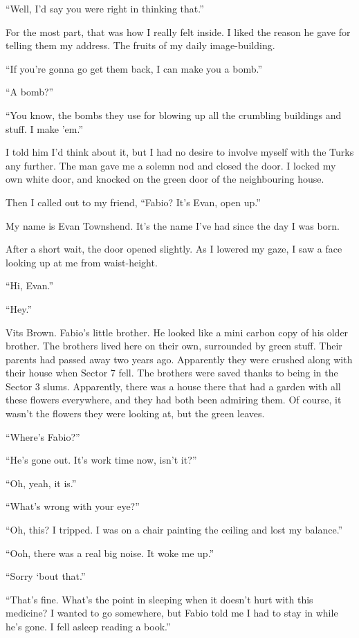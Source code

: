 \documentclass[oneside]{book}
\begin{document}
“Well, I’d say you were right in thinking that.”

For the most part, that was how I really felt inside. I liked the reason he gave for telling them my address. The fruits of my daily image-building.

“If you’re gonna go get them back, I can make you a bomb.”

“A bomb?”

“You know, the bombs they use for blowing up all the crumbling buildings and stuff. I make ’em.”

I told him I’d think about it, but I had no desire to involve myself with the Turks any further. The man gave me a solemn nod and closed the door. I locked my own white door, and knocked on the green door of the neighbouring house.

Then I called out to my friend, “Fabio? It’s Evan, open up.”

My name is Evan Townshend. It’s the name I’ve had since the day I was born.

After a short wait, the door opened slightly. As I lowered my gaze, I saw a face looking up at me from waist-height.

“Hi, Evan.”

“Hey.”

Vits Brown. Fabio’s little brother. He looked like a mini carbon copy of his older brother. The brothers lived here on their own, surrounded by green stuff. Their parents had passed away two years ago. Apparently they were crushed along with their house when Sector 7 fell. The brothers were saved thanks to being in the Sector 3 slums. Apparently, there was a house there that had a garden with all these flowers everywhere, and they had both been admiring them. Of course, it wasn’t the flowers they were looking at, but the green leaves.

“Where’s Fabio?”

“He’s gone out. It’s work time now, isn’t it?”

“Oh, yeah, it is.”

“What’s wrong with your eye?”

“Oh, this? I tripped. I was on a chair painting the ceiling and lost my balance.”

“Ooh, there was a real big noise. It woke me up.”

“Sorry ‘bout that.”

“That’s fine. What’s the point in sleeping when it doesn’t hurt with this medicine? I wanted to go somewhere, but Fabio told me I had to stay in while he’s gone. I fell asleep reading a book.”
\end{document}
